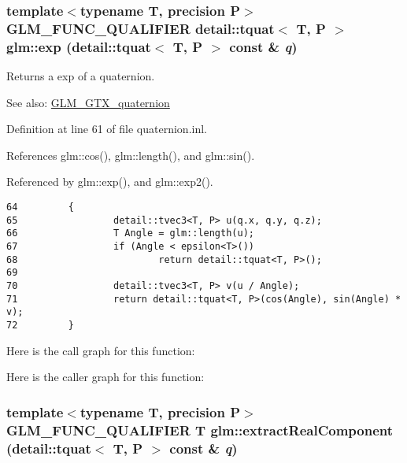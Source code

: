 \hypertarget{group__gtx__quaternion_gd4ec8f59911f01bb4c298839017ba91f}{
\subsubsection[exp]{\setlength{\rightskip}{0pt plus 5cm}template$<$typename T, precision P$>$ GLM\_\-FUNC\_\-QUALIFIER detail::tquat$<$ T, P $>$ glm::exp (detail::tquat$<$ T, P $>$ const \& {\em q})}}
\label{group__gtx__quaternion_gd4ec8f59911f01bb4c298839017ba91f}


Returns a exp of a quaternion.

\begin{Desc}
\item[See also:]\hyperlink{group__gtx__quaternion}{GLM\_\-GTX\_\-quaternion} \end{Desc}


Definition at line 61 of file quaternion.inl.

References glm::cos(), glm::length(), and glm::sin().

Referenced by glm::exp(), and glm::exp2().

\begin{Code}\begin{verbatim}64         {
65                 detail::tvec3<T, P> u(q.x, q.y, q.z);
66                 T Angle = glm::length(u);
67                 if (Angle < epsilon<T>())
68                         return detail::tquat<T, P>();
69 
70                 detail::tvec3<T, P> v(u / Angle);
71                 return detail::tquat<T, P>(cos(Angle), sin(Angle) * v);
72         }
\end{verbatim}
\end{Code}




Here is the call graph for this function:

Here is the caller graph for this function:\hypertarget{group__gtx__quaternion_g1185beb6d3dd4bcf64ea30f5f12a7368}{
\subsubsection[extractRealComponent]{\setlength{\rightskip}{0pt plus 5cm}template$<$typename T, precision P$>$ GLM\_\-FUNC\_\-QUALIFIER T glm::extractRealComponent (detail::tquat$<$ T, P $>$ const \& {\em q})}}
\label{group__gtx__quaternion_g1185beb6d3dd4bcf64ea30f5f12a7368}


